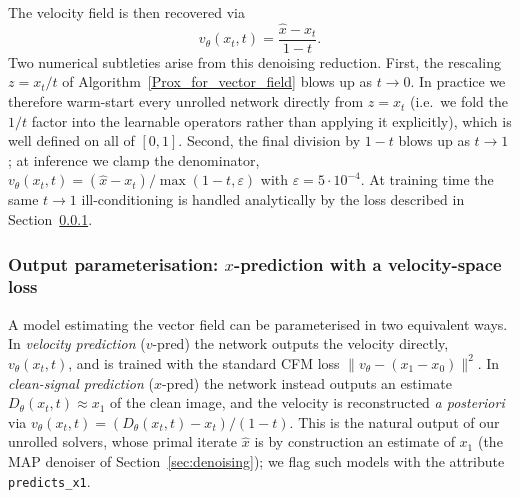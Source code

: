 


The velocity field is then recovered via
\begin{equation}
    v_\theta(x_t, t) = \frac{\hat{x} - x_t}{1-t}.
\end{equation}
Two numerical subtleties arise from this denoising reduction. First, the
rescaling $z = x_t/t$ of Algorithm~\ref{Prox_for_vector_field} blows up as
$t \to 0$. In practice we therefore warm-start every unrolled network directly
from $z = x_t$ (i.e.\ we fold the $1/t$ factor into the learnable operators
rather than applying it explicitly), which is well defined on all of
$[0,1]$. Second, the final division by $1-t$ blows up as $t \to 1$; at
inference we clamp the denominator, $v_\theta(x_t,t) = (\hat{x}-x_t)/\max(1-t,\varepsilon)$
with $\varepsilon = 5\cdot 10^{-4}$. At training time the same $t\to 1$
ill-conditioning is handled analytically by the loss described in
Section~\ref{subsubsec:xpred}.



\subsubsection{Output parameterisation: $x$-prediction with a velocity-space loss}
\label{subsubsec:xpred}

A model estimating the vector field can be parameterised in two equivalent ways.
In \emph{velocity prediction} ($v$-pred) the network outputs the velocity
directly, $v_\theta(x_t,t)$, and is trained with the standard CFM loss
$\|v_\theta - (x_1-x_0)\|^2$. In \emph{clean-signal prediction} ($x$-pred) the
network instead outputs an estimate $D_\theta(x_t,t) \approx x_1$ of the clean
image, and the velocity is reconstructed \emph{a posteriori} via
$v_\theta(x_t,t) = (D_\theta(x_t,t) - x_t)/(1-t)$. This is the natural output of
our unrolled solvers, whose primal iterate $\hat{x}$ is by construction an
estimate of $x_1$ (the MAP denoiser of Section~\ref{sec:denoising}); we flag such
models with the attribute \texttt{predicts\_x1}.

